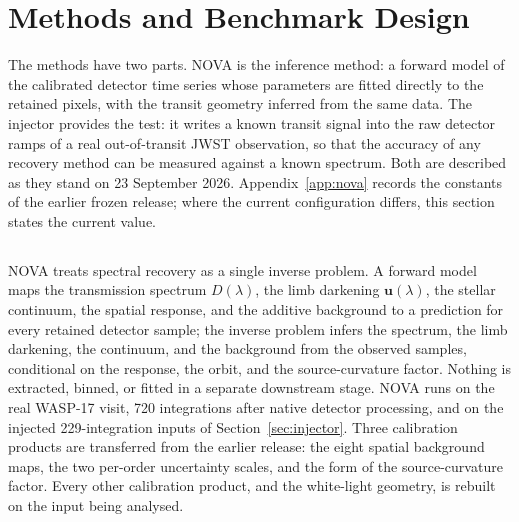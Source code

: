 \section{Methods and Benchmark Design}
\label{sec:methods}


The methods have two parts. NOVA is the inference method: a forward model
of the calibrated detector time series whose parameters are fitted
directly to the retained pixels, with the transit geometry inferred from
the same data. The injector provides the test: it writes a known transit
signal into the raw detector ramps of a real out-of-transit JWST
observation, so that the accuracy of any recovery method can be measured
against a known spectrum. Both are described as they stand on
23 September 2026. Appendix~\ref{app:nova} records the constants of the
earlier frozen release; where the current configuration differs, this
section states the current value.

\subsection{\nova{}}


NOVA treats spectral recovery as a single inverse problem. A forward
model maps the transmission spectrum $D(\lambda)$, the limb darkening
$\bm{u}(\lambda)$, the stellar continuum, the spatial response, and the
additive background to a prediction for every retained detector sample;
the inverse problem infers the spectrum, the limb darkening, the
continuum, and the background from the observed samples, conditional on
the response, the orbit, and the source-curvature factor. Nothing is
extracted, binned, or fitted in a separate downstream stage. NOVA runs on
the real WASP-17 visit, 720 integrations after native detector
processing, and on the injected 229-integration inputs of
Section~\ref{sec:injector}. Three calibration products are transferred
from the earlier release: the eight spatial background maps, the two
per-order uncertainty scales, and the form of the source-curvature
factor. Every other calibration product, and the white-light geometry,
is rebuilt on the input being analysed.

